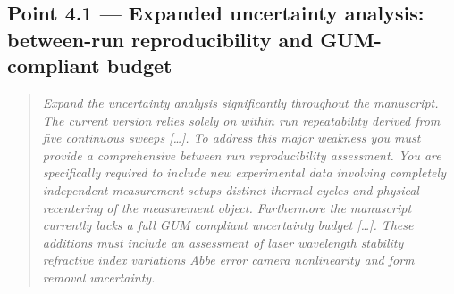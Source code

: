 \documentclass[11pt,a4paper]{article}
\newenvironment{reviewercomment}%
{\par\medskip\noindent\begin{quotation}\itshape\color{black!70}}%
{\end{quotation}\medskip}
\begin{document}
\subsection*{Point 4.1 --- Expanded uncertainty analysis: between-run reproducibility and GUM-compliant budget}
\begin{reviewercomment}
Expand the uncertainty analysis significantly throughout the manuscript. The current version relies solely on within run repeatability derived from five continuous sweeps [\ldots]. To address this major weakness you must provide a comprehensive between run reproducibility assessment. You are specifically required to include new experimental data involving completely independent measurement setups distinct thermal cycles and physical recentering of the measurement object. Furthermore the manuscript currently lacks a full GUM compliant uncertainty budget [\ldots]. These additions must include an assessment of laser wavelength stability refractive index variations Abbe error camera nonlinearity and form removal uncertainty.
\end{reviewercomment}
\end{document}
